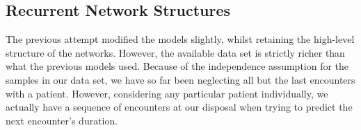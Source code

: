 \documentclass[10pt, twoside, a4paper]{article}
\begin{document}
	\subsection{Recurrent Network Structures}
%	
%
	The previous attempt modified the models slightly, whilst retaining the high-level structure 
	of the networks. However, the available data set  is strictly richer than what the 
	previous models used. Because of the independence assumption for the samples in our data set, 
	we have so far been neglecting all but the last encounters with a patient. However, 
	considering any particular patient individually, we actually have a sequence of encounters 
	at our disposal when trying to predict the next encounter's duration.
\end{document}
